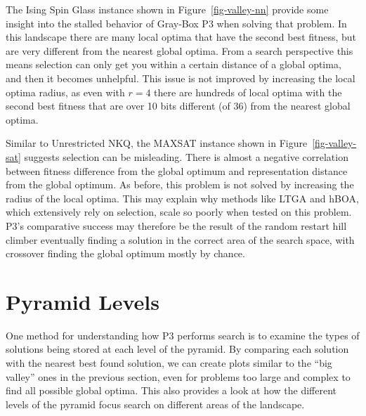The Ising Spin Glass instance shown in Figure~\ref{fig-valley-nn} provide some insight into the stalled behavior of Gray-Box
P3 when solving that problem. In this landscape there are many local optima that have the second best fitness, but are very
different from the nearest global optima. From a search perspective this means selection can only get you within a certain distance
of a global optima, and then it becomes unhelpful. This issue is not improved by increasing the local optima radius, as even with
$r=4$ there are hundreds of local optima with the second best fitness that are over 10 bits different (of 36) from
the nearest global optima.

\begin{figure*}
  \centering
  \caption{Location and quality of local optima in comparison to the global optima for a representative MAX-SAT problem
           with $N=36$.}
  \label{fig-valley-sat}
\end{figure*}

Similar to Unrestricted NKQ, the MAXSAT instance shown in Figure~\ref{fig-valley-sat} suggests selection can be misleading.
There is almost a negative correlation between fitness difference from the global optimum and representation distance from the
global optimum. As before, this problem is not solved by increasing the radius of the local optima.
This may explain why methods like LTGA and hBOA, which extensively rely on selection,
scale so poorly when tested on this problem. P3's comparative success may therefore be the result of the random restart hill climber
eventually finding a solution in the correct area of the search space, with crossover finding the global optimum mostly by chance.

\section{Pyramid Levels}
One method for understanding how P3 performs search is to examine the types of solutions being stored at each level
of the pyramid. By comparing each solution with the nearest best found solution, we can create plots similar to the ``big valley''
ones in the previous section, even for problems too large and complex to find all possible global optima. 
This also provides a look at how the different levels of the pyramid focus search on different areas of the landscape.

\begin{figure*}
  \centering
  \caption{Distribution of local optima stored at each level of Gray-Box P3 in relation to the global optimum on
           the Deceptive Step Trap problem $N=6000$ and traps of size 5.}
  \label{fig-level-dst}
\end{figure*}

